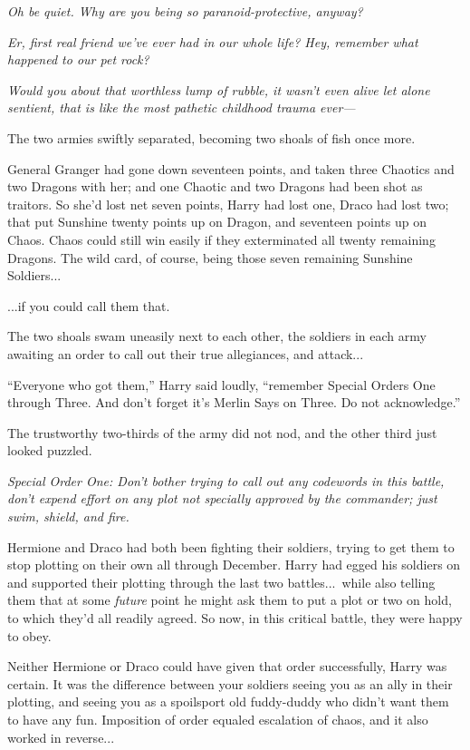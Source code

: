 \emph{Oh be quiet. Why are you being so paranoid-protective, anyway?}

\emph{Er, first real friend we’ve ever had in our whole life? Hey, remember what happened to our pet rock?}

\emph{Would you  about that worthless lump of rubble, it wasn’t even alive let alone sentient, that is like the most pathetic childhood trauma ever—}

The two armies swiftly separated, becoming two shoals of fish once more.

General Granger had gone down seventeen points, and taken three Chaotics and two Dragons with her; and one Chaotic and two Dragons had been shot as traitors. So she’d lost net seven points, Harry had lost one, Draco had lost two; that put Sunshine twenty points up on Dragon, and seventeen points up on Chaos. Chaos could still win easily if they exterminated all twenty remaining Dragons. The wild card, of course, being those seven remaining Sunshine Soldiers...

...if you could call them that.

The two shoals swam uneasily next to each other, the soldiers in each army awaiting an order to call out their true allegiances, and attack...

“Everyone who got them,” Harry said loudly, “remember Special Orders One through Three. And don’t forget it’s Merlin Says on Three. Do not acknowledge.”

The trustworthy two-thirds of the army did not nod, and the other third just looked puzzled.

\emph{Special Order One: Don’t bother trying to call out any codewords in this battle, don’t expend effort on any plot not specially approved by the commander; just swim, shield, and fire.}

Hermione and Draco had both been fighting their soldiers, trying to get them to stop plotting on their own all through December. Harry had egged his soldiers on and supported their plotting through the last two battles...\ while also telling them that at some \emph{future} point he might ask them to put a plot or two on hold, to which they’d all readily agreed. So now, in this critical battle, they were happy to obey.

Neither Hermione or Draco could have given that order successfully, Harry was certain. It was the difference between your soldiers seeing you as an ally in their plotting, and seeing you as a spoilsport old fuddy-duddy who didn’t want them to have any fun. Imposition of order equaled escalation of chaos, and it also worked in reverse...


